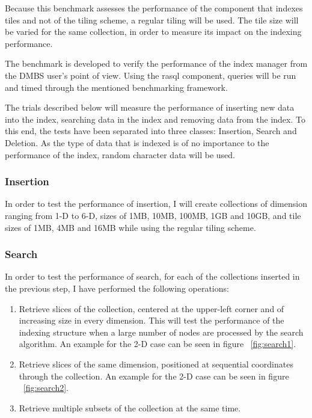 \documentclass[11pt, a4paper, oneside]{article}
\begin{document}
Because this benchmark assesses the performance of the component that indexes tiles and not of the tiling scheme, a regular tiling will be used. The tile size will be varied for the same collection, in order to measure its impact on the indexing performance.

The benchmark is developed to verify the performance of the index manager from the DMBS user's point of view. Using the rasql component, queries will be run and timed through the mentioned benchmarking framework.


 The trials described below will measure the performance of inserting new data into the index, searching data in the index and removing data from the index. To this end, the tests have been separated into three classes: Insertion, Search and Deletion. As the type of data that is indexed is of no importance to the performance of the index, random character data will be used.
 
\subsubsection*{Insertion}
In order to test the performance of insertion, I will create collections of dimension ranging from 1-D to 6-D, sizes of 1MB, 10MB, 100MB, 1GB and 10GB, and tile sizes of 1MB, 4MB and 16MB while using the regular tiling scheme.

\subsubsection*{Search}
In order to test the performance of search, for each of the collections inserted in the previous step, I have performed the following operations:
\begin{enumerate}
\item Retrieve slices of the collection, centered at the upper-left corner and of increasing size in every dimension. This will test the performance of the indexing structure when a large number of nodes are processed by the search algorithm. An example for the 2-D case can be seen in figure ~\ref{fig:search1}.
\item Retrieve slices of the same dimension, positioned at sequential coordinates through the collection. An example for the 2-D case can be seen in figure ~\ref{fig:search2}. 
\item Retrieve multiple subsets of the collection at the same time.
\end{enumerate}
\end{document}
